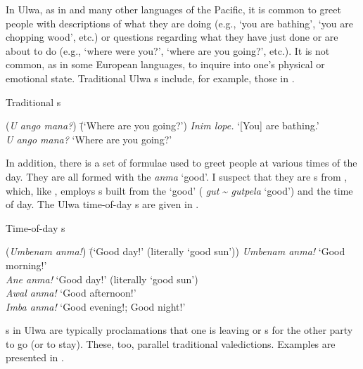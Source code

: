 In Ulwa, as in  and many other languages of the Pacific, it is common to  greet people with descriptions of what they are doing (e.g., ‘you are bathing’, ‘you are chopping wood’, etc.) or questions regarding what they have just done or are about to do (e.g., ‘where were you?’, ‘where are you going?’, etc.). It is not common, as in some European languages, to inquire into one’s physical or emotional state. Traditional Ulwa s include, for example, those in .

\ea%
    \label{ex:sem:11}
          Traditional s
\begin{tabbing}
{(\textit{U ango mana?})} \= {(‘Where are you going?’)}\kill
{\textit{Inim lope.}} \> {‘[You] are bathing.’}\\
{\textit{U ango mana?}} \> {‘Where are you going?’}
\end{tabbing}
\z

In addition, there is a set of formulae used to greet people at various times of the day. They are all formed with the  \textit{anma} ‘good’. I suspect that they are s from , which, like , employs s built from the  ‘good’ ( \textit{gut} {\textasciitilde} \textit{gutpela} ‘good’) and the time of day. The Ulwa time-of-day s are given in .

\ea%
    \label{ex:sem:12}
          Time-of-day s
\begin{tabbing}
{(\textit{Umbenam anma!})} \= {(‘Good day!’ (literally ‘good sun’))}\kill
{\textit{Umbenam anma!}} \> {‘Good morning!’}\\
{\textit{Ane anma!}} \> {‘Good day!’ (literally ‘good sun’)}\\
{\textit{Awal anma!}} \> {‘Good afternoon!’\footnotemark{}}\\
{\textit{Imba anma!}} \> {‘Good evening!; Good night!’\footnotemark{}}
\end{tabbing}
\z
{}

s in Ulwa are typically proclamations that one is leaving or s for the other party to go (or to stay). These, too, parallel traditional  valedictions. Examples are presented in .

